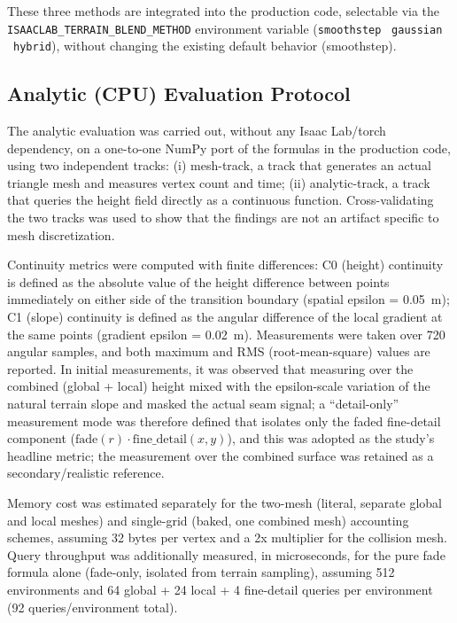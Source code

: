 These three methods are integrated into the production code, selectable
via the \texttt{ISAACLAB\_TERRAIN\_BLEND\_METHOD} environment variable
(\texttt{smoothstep} \textbar\ \texttt{gaussian} \textbar\
\texttt{hybrid}), without changing the existing default behavior
(smoothstep).

\subsection{Analytic (CPU) Evaluation Protocol}
\label{sec:analitikprotokol}

The analytic evaluation was carried out, without any Isaac Lab/torch
dependency, on a one-to-one NumPy port of the formulas in the production
code, using two independent tracks: (i) mesh-track, a track that
generates an actual triangle mesh and measures vertex count and time;
(ii) analytic-track, a track that queries the height field directly as a
continuous function. Cross-validating the two tracks was used to show
that the findings are not an artifact specific to mesh discretization.

Continuity metrics were computed with finite differences: C0 (height)
continuity is defined as the absolute value of the height difference
between points immediately on either side of the transition boundary
(spatial epsilon = 0.05~m); C1 (slope) continuity is defined as the
angular difference of the local gradient at the same points (gradient
epsilon = 0.02~m). Measurements were taken over 720 angular samples, and
both maximum and RMS (root-mean-square) values are reported. In initial
measurements, it was observed that measuring over the combined (global +
local) height mixed with the epsilon-scale variation of the natural
terrain slope and masked the actual seam signal; a ``detail-only''
measurement mode was therefore defined that isolates only the faded
fine-detail component
($\mathrm{fade}(r)\cdot\mathrm{fine\_detail}(x,y)$), and this was
adopted as the study's headline metric; the measurement over the
combined surface was retained as a secondary/realistic reference.

Memory cost was estimated separately for the two-mesh (literal, separate
global and local meshes) and single-grid (baked, one combined mesh)
accounting schemes, assuming 32 bytes per vertex and a 2x multiplier for
the collision mesh. Query throughput was additionally measured, in
microseconds, for the pure fade formula alone (fade-only, isolated from
terrain sampling), assuming 512 environments and 64 global + 24 local +
4 fine-detail queries per environment (92 queries/environment total).

